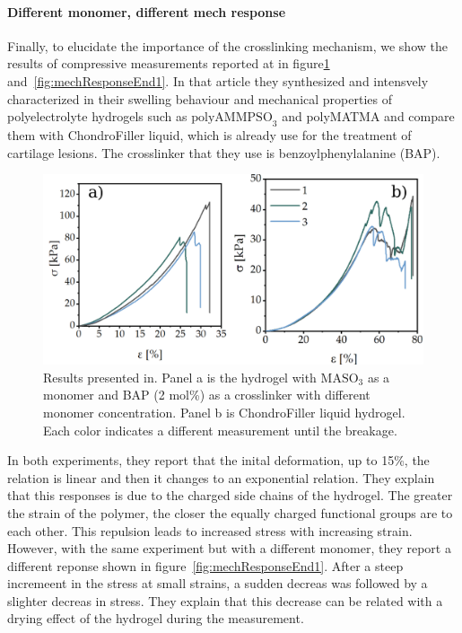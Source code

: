 \paragraph{Different monomer, different mech response}
Finally, to elucidate the importance of the crosslinking mechanism, we show the results of compressive measurements reported at\citep{romischkeSwellingMechanicalCharacterization2022} in figure\ref{fig:mechResponseEnd} and~\ref{fig:mechResponseEnd1}.
In that article they synthesized and intensvely characterized in their swelling behaviour and mechanical properties of polyelectrolyte hydrogels such as $\mathrm{polyAMMPSO}_3$ and polyMATMA and compare them with ChondroFiller liquid, which is already use for the treatment of cartilage lesions.
The crosslinker that they use is benzoylphenylalanine (BAP).

\begin{figure}[ht!]
    \centering
    \includegraphics[width=\textwidth]{figs/mechResponse/2-ab.png}
    \caption{
        Results presented in\citep{romischkeSwellingMechanicalCharacterization2022}. 
    Panel a is the hydrogel with $\mathrm{MASO}_3$ as a monomer and BAP (2 mol\%) as a crosslinker with different monomer concentration.
    Panel b is ChondroFiller liquid hydrogel.
    Each color indicates a different measurement until the breakage.    
}\label{fig:mechResponseEnd}
\end{figure}

In both experiments, they report that the inital deformation, up to 15\%, the relation is linear and then it changes to an exponential relation.
They explain that this responses is due to the charged side chains of the hydrogel.
The greater the strain of the polymer, the closer the equally charged functional groups are to each other.
This repulsion leads to increased stress with increasing strain.
However, with the same experiment but with a different monomer, they report a different reponse shown in figure~\ref{fig:mechResponseEnd1}.
After a steep incremeent in the stress at small strains, a sudden decreas was followed by a slighter decreas in stress.
They explain that this decrease can be related with a drying effect of the hydrogel during the measurement.

